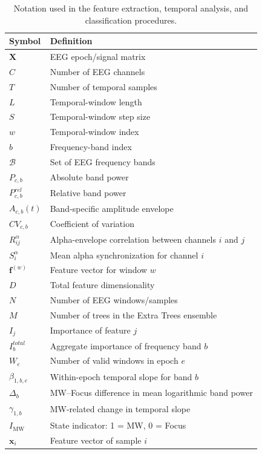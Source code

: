 \documentclass[conference]{IEEEtran}
\begin{document}
\begin{table}[htbp]
\centering
\caption{Notation used in the feature extraction, temporal analysis, and classification procedures.}
\label{tab:notation}
\begin{tabular}{ll}
\hline
\textbf{Symbol} & \textbf{Definition} \\
\hline
$\mathbf{X}$ & EEG epoch/signal matrix \\
$C$ & Number of EEG channels \\
$T$ & Number of temporal samples \\
$L$ & Temporal-window length \\
$S$ & Temporal-window step size \\
$w$ & Temporal-window index \\
$b$ & Frequency-band index \\
$\mathcal{B}$ & Set of EEG frequency bands \\
$P_{c,b}$ & Absolute band power \\
$P^{rel}_{c,b}$ & Relative band power \\
$A_{c,b}(t)$ & Band-specific amplitude envelope \\
$CV_{c,b}$ & Coefficient of variation \\
$R_{ij}^{\alpha}$ & Alpha-envelope correlation between channels $i$ and $j$ \\
$S_i^{\alpha}$ & Mean alpha synchronization for channel $i$ \\
$\mathbf{f}^{(w)}$ & Feature vector for window $w$ \\
$D$ & Total feature dimensionality \\
$N$ & Number of EEG windows/samples \\
$M$ & Number of trees in the Extra Trees ensemble \\
$I_j$ & Importance of feature $j$ \\
$I_b^{total}$ & Aggregate importance of frequency band $b$ \\
$W_e$ & Number of valid windows in epoch $e$ \\
$\beta_{1,b,e}$ & Within-epoch temporal slope for band $b$ \\
$\Delta_b$ & MW--Focus difference in mean logarithmic band power \\
$\gamma_{1,b}$ & MW-related change in temporal slope \\
$I_{\mathrm{MW}}$ & State indicator: 1 = MW, 0 = Focus \\
$\mathbf{x}_i$ & Feature vector of sample $i$ \\

\end{tabular}
\end{table}
\end{document}
